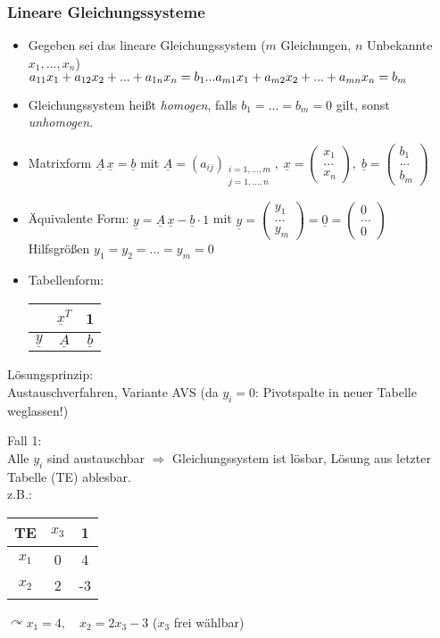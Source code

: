 \subsubsection{Lineare Gleichungssysteme}
\begin{itemize}
\item Gegeben sei das lineare Gleichungssystem ($m$ Gleichungen, $n$ Unbekannte $x_1,...,x_n$)\\
$a_{11}x_{1}+a_{12}x_2+...+a_{1n}x_n=b_1\\
...\\
a_{m1}x_1+a_{m2}x_2+...+a_{mn}x_n=b_m$
\item Gleichungssystem heißt \emph{homogen}, falls $b_1=...=b_m=0$ gilt, sonst \emph{unhomogen}.
\item Matrixform $\underline{A}\,\underline{x}=\underline{b}$ mit $\underline{A}=(a_{ij})_{\substack{i=1,...,m\\ j=1,...,n}},\;\underline{x}=\begin{pmatrix}
x_1\\
...\\
x_n
\end{pmatrix},\; \underline{b}=\begin{pmatrix}
b_1\\
...\\
b_m
\end{pmatrix}$
\item Äquivalente Form: $\underline{y}=\underline{A}\,\underline{x}-\underline{b}\cdot 1$ mit $\underline{y}=\begin{pmatrix}
y_1\\
...\\
y_m
\end{pmatrix} = \underline{0}=\begin{pmatrix}
0\\
...\\
0
\end{pmatrix}$\\
Hilfsgrößen $y_1=y_2=...=y_m=0$
\item Tabellenform: \begin{tabular}{c | c c}
& $\underline{x}^T$ & 1\\
\hline
$\underline{y}$ & $\underline{A}$ & $\underline{b}$
\end{tabular}
\end{itemize}
Lösungsprinzip: \\
Austauschverfahren, Variante AVS (da $y_i=0$: Pivotspalte in neuer Tabelle weglassen!)

Fall 1:\\
Alle $y_i$ sind austauschbar $\Rightarrow$ Gleichungssystem ist lösbar, Lösung aus letzter Tabelle (TE) ablesbar.\\
z.B.: \begin{tabular}{ c | c c}
TE & $x_3$ & 1 \\
\hline
$x_1$ & 0 & 4\\
$x_2$ & 2 & -3
\end{tabular} \qquad $\curvearrowright x_1=4, \quad x_2=2x_3-3$ ($x_3$ frei wählbar)

